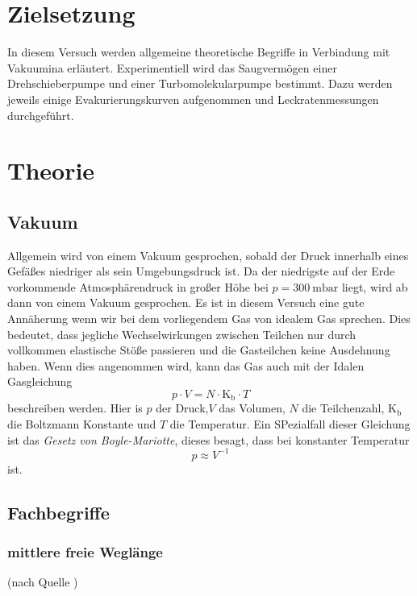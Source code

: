 \section{Zielsetzung}

	In diesem Versuch werden allgemeine theoretische Begriffe in Verbindung mit Vakuumina erläutert.
	Experimentiell wird das Saugvermögen einer Drehschieberpumpe und einer Turbomolekularpumpe bestimmt.
	Dazu werden jeweils einige Evakurierungskurven aufgenommen und Leckratenmessungen durchgeführt.

\section{Theorie}
	
	\subsection{Vakuum}
		
		Allgemein wird von einem Vakuum gesprochen, sobald der Druck innerhalb eines Gefäßes niedriger als sein Umgebungsdruck ist.
		Da der niedrigste auf der Erde vorkommende Atmosphärendruck in großer Höhe bei $p = \SI{300}{\milli\bar}$ liegt, wird ab dann von einem Vakuum gesprochen.
		Es ist in diesem Versuch eine gute Annäherung wenn wir bei dem vorliegendem Gas von idealem Gas sprechen. 
		Dies bedeutet, dass jegliche Wechselwirkungen zwischen Teilchen nur durch vollkommen elastische Stöße passieren und die Gasteilchen keine Ausdehnung haben.
		Wenn dies angenommen wird, kann das Gas auch mit der Idalen Gasgleichung
		\begin{equation}
			p \cdot V = N \cdot \text{K}_\text{b} \cdot T
		\end{equation}
		beschreiben werden.
		Hier is $p$ der Druck,$V$ das Volumen, $N$ die Teilchenzahl, $\text{K}_\text{b}$ die Boltzmann Konstante und $T$ die Temperatur. 
		Ein SPezialfall dieser Gleichung ist das \textit{Gesetz von Boyle-Mariotte}, dieses besagt, dass bei konstanter Temperatur
		\begin{equation}
			p \approx V^{-1}
		\end{equation}
		ist.

	\subsection{Fachbegriffe}

		\subsubsection{mittlere freie Weglänge}(nach Quelle \cite{wiki:mfW})
		
